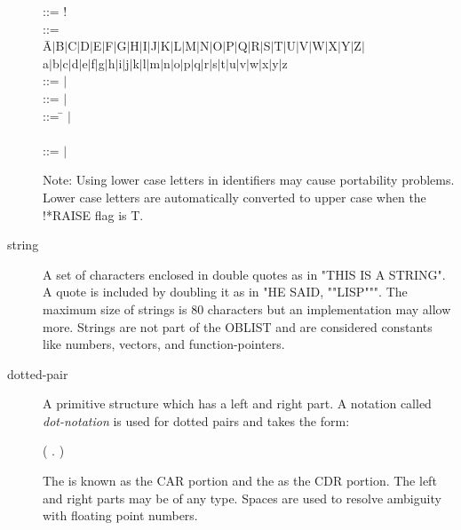 \begin{description}
\begin{tabbing}
 ::= ! \\
 ::= \\
\hspace*{.25in} \= A$\mid$B$\mid$C$\mid$D$\mid$E$\mid$F$\mid$G$\mid$H$
\mid$I$\mid$J$\mid$K$\mid$L$\mid$M$\mid$N$\mid$O$\mid$P$\mid$Q$\mid$R$
\mid$S$\mid$T$\mid$U$\mid$V$\mid$W$\mid$X$\mid$Y$\mid$Z$\mid$ \\
\> a$\mid$b$\mid$c$\mid$d$\mid$e$\mid$f$\mid$g$\mid$h$\mid$i$\mid$j$
\mid$k$\mid$l$\mid$m$\mid$n$\mid$o$\mid$p$\mid$q$\mid$r$\mid$s$\mid$t$
\mid$u$\mid$v$\mid$w$\mid$x$\mid$y$\mid$z \\
 ::= $\mid$ \\
 ::= $\mid$ \\
 ::= \=  $\mid$ \\
\>  \\
 ::= $\mid$
\end{tabbing}

Note: Using lower case letters in identifiers may cause portability
problems. Lower case letters are automatically converted to upper case
when the !*RAISE flag is T. 


\item[string]  A set of characters enclosed in double quotes as
in "THIS IS A STRING". A quote is included by doubling it as in "HE
SAID, ""LISP""". The maximum size of strings is 80 characters but an
implementation may allow more. Strings are not part of the OBLIST and
are considered constants like numbers, vectors, and function-pointers.

\item[dotted-pair] A primitive structure which has a left and right part.
 
A notation called {\em dot-notation} is used for dotted pairs and
takes the form:

\begin{tabbing}
( . )
\end{tabbing}

The  is known as the CAR portion and the 
as the CDR portion. The left and right parts may be of any type.
Spaces are used to resolve ambiguity with floating point numbers.



\end{description}
